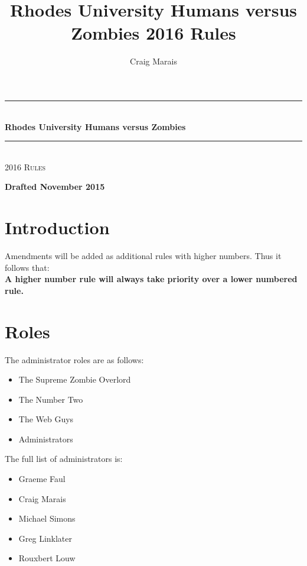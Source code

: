 \documentclass[a4paper,12pt]{article}
\title{Rhodes University Humans versus Zombies 2016 Rules}
\author{Craig Marais}
\begin{document}


\begin{titlepage}
\pagestyle{empty}
\begin{center}




\rule{\linewidth}{0.5mm}
\\[5mm]

{\Large \bfseries Rhodes University Humans versus Zombies}
\rule{\linewidth}{0.5mm}
\\[5mm]

\textsc{\Large 2016 Rules}
\\[5mm]

\vfill

\textbf{Drafted November 2015}

\end{center}
\end{titlepage}

\newpage
\tableofcontents

\newpage
\section{Introduction}
Amendments will be added as additional rules with higher numbers. Thus it follows that:
\\
{\bf A higher number rule will always take priority over a lower numbered rule.}

\section{Roles}

The administrator roles are as follows:
\begin{itemize}
    \item {The Supreme Zombie Overlord}
    \item {The Number Two}
    \item {The Web Guys}
    \item {Administrators}
\end{itemize}

The full list of administrators is:
\begin{itemize}
    \item {Graeme Faul}
    \item {Craig Marais}
    \item {Michael Simons}
    \item {Greg Linklater}
    \item {Rouxbert Louw}
\end{itemize}
\end{document}
